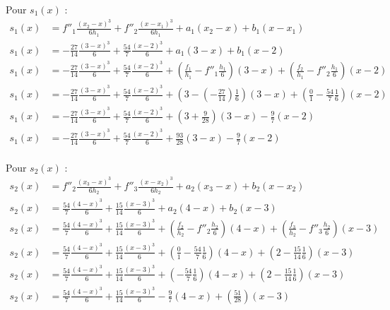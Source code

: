 \documentclass{article}
\begin{document}
\newpage
\begingroup\raggedleft
Pour $s_1(x)$ :
\endgroup
\begin{align*}
s_1(x) & = f''_1 \frac{(x_2-x)^3}{6h_1}+ f''_2 \frac{(x-x_1)^3}{6h_1}+a_1(x_2-x) + b_1 (x-x_1)
\\[5pt]
s_1(x) & = -\frac{27}{14} \frac{(3-x)^3}{6}+ \frac{54}{7} \frac{(x-2)^3}{6}+a_1(3-x) + b_1 (x-2)
\\[5pt]
s_1(x) & = -\frac{27}{14} \frac{(3-x)^3}{6}+ \frac{54}{7} \frac{(x-2)^3}{6}+(\frac{f_1}{h_1}-f''_1 \frac{h_1}{6})(3-x) + (\frac{f_2}{h_1}-f''_2\frac{h_1}{6})(x-2)
\\[5pt]
s_1(x) & = -\frac{27}{14} \frac{(3-x)^3}{6} + \frac{54}{7} \frac{(x-2)^3}{6}+(3-(-\frac{27}{14})\frac{1}{6})(3-x) + (\frac{0}{1}-\frac{54}{7}\frac{1}{6})(x-2)
\\[5pt]
s_1(x) & = -\frac{27}{14} \frac{(3-x)^3}{6} + \frac{54}{7} \frac{(x-2)^3}{6} +(3 + \frac{9}{28})(3-x) -\frac{9}{7}(x-2)
\\[5pt]
s_1(x) & = -\frac{27}{14} \frac{(3-x)^3}{6} +\frac{54}{7} \frac{(x-2)^3}{6} + \frac{93}{28}(3-x) - \frac{9}{7}(x-2)
\end{align*}
\\
Pour $s_2(x)$ :
\begin{align*}
s_2(x) & = f''_2 \frac{(x_3-x)^3}{6h_2}+ f''_3 \frac{(x-x_2)^3}{6h_2}+a_2(x_3-x) + b_2 (x-x_2)
\\[5pt]
s_2(x) & = \frac{54}{7}\frac{(4-x)^3}{6} + \frac{15}{14} \frac{(x-3)^3}{6}+a_2(4-x) + b_2(x-3)
\\[5pt]
s_2(x) & = \frac{54}{7}\frac{(4-x)^3}{6} + \frac{15}{14} \frac{(x-3)^3}{6}+(\frac{f_2}{h_2}-f''_2 \frac{h_2}{6})(4-x) + (\frac{f_3}{h_2}-f''_3\frac{h_2}{6})(x-3)
\\[5pt]
s_2(x) & = \frac{54}{7}\frac{(4-x)^3}{6} + \frac{15}{14} \frac{(x-3)^3}{6}+(\frac{0}{1}-\frac{54}{7} \frac{1}{6})(4-x) + (2-\frac{15}{14}\frac{1}{6})(x-3)
\\[5pt]
s_2(x) & = \frac{54}{7}\frac{(4-x)^3}{6} + \frac{15}{14} \frac{(x-3)^3}{6}+(-\frac{54}{7} \frac{1}{6})(4-x) + (2-\frac{15}{14}\frac{1}{6})(x-3)
\\[5pt]
s_2(x) & = \frac{54}{7}\frac{(4-x)^3}{6} + \frac{15}{14} \frac{(x-3)^3}{6}-\frac{9}{7}(4-x) + (\frac{51}{28})(x-3)
\end{align*}
\end{document}
